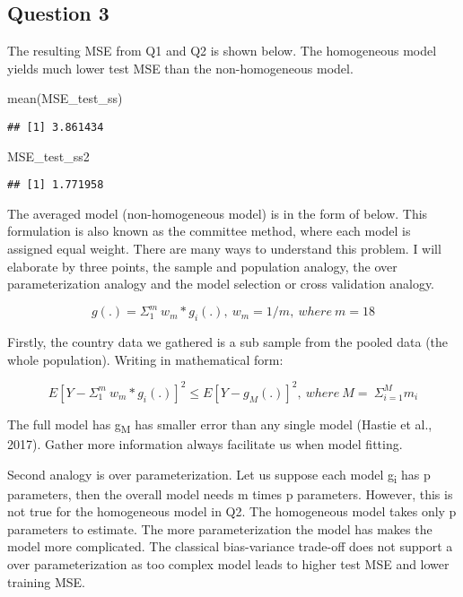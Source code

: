 \documentclass[
]{article}
\newenvironment{Shaded}{\begin{snugshade}}{\end{snugshade}}
\newcommand{\FunctionTok}[1]{\textcolor[rgb]{0.00,0.00,0.00}{#1}}
\newcommand{\NormalTok}[1]{#1}
\begin{document}
\hypertarget{question-3}{%
\subsection{Question 3}\label{question-3}}

The resulting MSE from Q1 and Q2 is shown below. The homogeneous model
yields much lower test MSE than the non-homogeneous model.

\begin{Shaded}
\begin{Highlighting}[]
\FunctionTok{mean}\NormalTok{(MSE\_test\_ss)}
\end{Highlighting}
\end{Shaded}

\begin{verbatim}
## [1] 3.861434
\end{verbatim}

\begin{Shaded}
\begin{Highlighting}[]
\NormalTok{MSE\_test\_ss2}
\end{Highlighting}
\end{Shaded}

\begin{verbatim}
## [1] 1.771958
\end{verbatim}

The averaged model (non-homogeneous model) is in the form of below. This
formulation is also known as the committee method, where each model is
assigned equal weight. There are many ways to understand this problem. I
will elaborate by three points, the sample and population analogy, the
over parameterization analogy and the model selection or cross
validation analogy.

\[
g(.) = \Sigma^{m}_1 \ w_m*g_i(.) , \ w_m = 1/m ,\  where\ m = 18
\]

Firstly, the country data we gathered is a sub sample from the pooled
data (the whole population). Writing in mathematical form:

\[
E[Y - \Sigma^{m}_1 \ w_m*g_i(.)]^2 \leq E[Y - g_M(.)]^2, \ where \ M = \ \Sigma^{M}_{i = 1} m_i
\]

The full model has g\textsubscript{M} has smaller error than any single
model (Hastie et al., 2017). Gather more information always facilitate
us when model fitting.

Second analogy is over parameterization. Let us suppose each model
g\textsubscript{i} has p parameters, then the overall model needs m
times p parameters. However, this is not true for the homogeneous model
in Q2. The homogeneous model takes only p parameters to estimate. The
more parameterization the model has makes the model more complicated.
The classical bias-variance trade-off does not support a over
parameterization as too complex model leads to higher test MSE and lower
training MSE.
\end{document}
